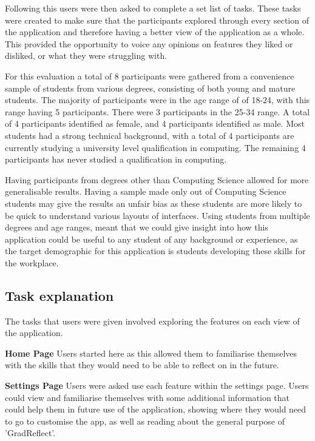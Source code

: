 \documentclass{l4proj}
\begin{document}
Following this users were then asked to complete a set list of tasks. These tasks were created to make sure that the participants explored through every section of the application and therefore having a better view of the application as a whole. This provided the opportunity to voice any opinions on features they liked or disliked, or what they were struggling with. 

For this evaluation a total of 8 participants were gathered from a convenience sample of students from various degrees, consisting of both young and mature students. The majority of participants were in the age range of of 18-24, with this range having 5 participants. There were 3 participants in the 25-34 range. A total of 4 participants identified as female, and 4 participants identified as male. Most students had a strong technical background, with a total of 4 participants are currently studying a university level qualification in computing. The remaining 4 participants has never studied a qualification in computing.

Having participants from degrees other than Computing Science allowed for more generalisable results. Having a sample made only out of Computing Science students may give the results an unfair bias as these students are more likely to be quick to understand various layouts of interfaces. Using students from multiple degrees and age ranges, meant that we could give insight into how this application could be useful to any student of any background or experience, as the target demographic for this application is students developing these skills for the workplace.

\subsection{Task explanation}

The tasks that users were given involved exploring the features on each view of the application.

\textbf{Home Page} Users started here as this allowed them to familiarise themselves with the skills that they would need to be able to reflect on in the future. 
 
\textbf{Settings Page} Users were asked use each feature within the settings page. Users could view and familiarise themselves with some additional information that could help them in future use of the application, showing where they would need to go to customise the app, as well as reading about the general purpose of 'GradReflect'.
\end{document}
